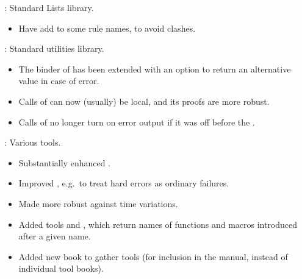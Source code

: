 
\begin{frame}

\implibtitle

:
Standard Lists library.
\begin{itemize}
\item Have  add  to some rule names, to avoid clashes.
\end{itemize}

\end{frame}


\begin{frame}

\implibtitle

:
Standard utilities library.
\begin{itemize}
\item The  binder of  has been extended with
  an option  to return an alternative value in case of error.
\item Calls of  can now (usually) be local, and its proofs are more robust.
\item Calls of  no longer turn on error output if it was off before the .
\end{itemize}

\end{frame}


\begin{frame}

\implibtitle

:
Various tools.
\begin{itemize}
\item Substantially enhanced .
\item Improved , e.g.\ to treat hard errors as ordinary failures.
\item Made  more robust against time variations.
\item Added tools  and ,
  which return names of functions and macros introduced after a given name.
\item Added new  book to gather tools (for inclusion in the
  manual, instead of individual tool books).
\end{itemize}

\end{frame}

